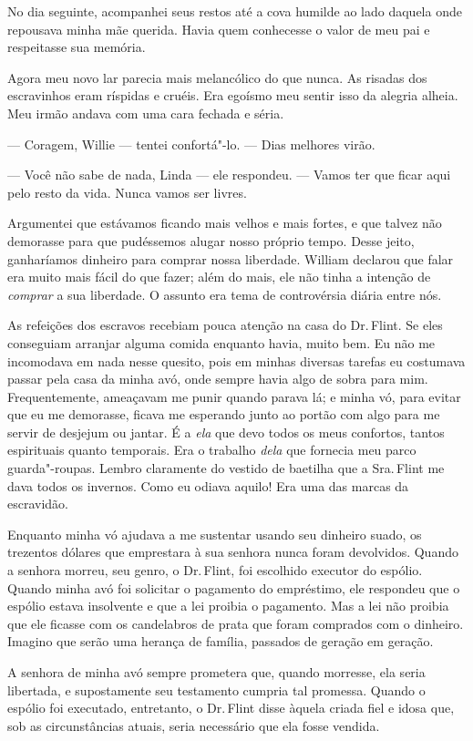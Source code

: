 No dia seguinte, acompanhei seus restos
até a cova humilde ao lado daquela onde repousava minha mãe querida.
Havia quem conhecesse o valor de meu pai e respeitasse sua memória.

Agora meu novo lar parecia mais
melancólico do que nunca. As risadas dos escravinhos eram ríspidas e
cruéis. Era egoísmo meu sentir isso da alegria alheia. Meu irmão andava
com uma cara fechada e séria.

--- Coragem, Willie --- tentei confortá"-lo. --- Dias melhores virão.

--- Você não sabe de nada, Linda ---
ele respondeu. --- Vamos ter que ficar aqui pelo resto da vida. Nunca
vamos ser livres.

Argumentei
que estávamos ficando mais velhos e mais fortes, e que talvez não
demorasse para que pudéssemos alugar nosso próprio tempo. Desse jeito,
ganharíamos dinheiro para comprar nossa liberdade. William declarou que
falar era muito mais fácil do que fazer; além do mais, ele não tinha a
intenção de \emph{comprar} a sua liberdade. O assunto era tema de
controvérsia diária entre nós.

As refeições dos escravos recebiam
pouca atenção na casa do Dr.\,Flint. Se eles conseguiam arranjar alguma
comida enquanto havia, muito bem. Eu não me incomodava em nada nesse
quesito, pois em minhas diversas tarefas eu costumava passar pela casa
da minha avó, onde sempre havia algo de sobra para mim. Frequentemente,
ameaçavam me punir quando parava lá; e minha vó, para evitar que eu me
demorasse, ficava me esperando junto ao portão com algo para me servir
de desjejum ou jantar. É a \emph{ela} que devo todos os meus confortos,
tantos espirituais quanto temporais. Era o trabalho \emph{dela} que
fornecia meu parco guarda"-roupas. Lembro claramente do vestido de
baetilha que a Sra.\,Flint me dava todos os invernos. Como eu odiava
aquilo! Era uma das marcas da escravidão.

Enquanto minha vó ajudava a me
sustentar usando seu dinheiro suado, os trezentos dólares que emprestara
à sua senhora nunca foram devolvidos. Quando a senhora morreu, seu
genro, o Dr.\,Flint, foi escolhido executor do espólio. Quando minha avó
foi solicitar o pagamento do empréstimo, ele respondeu que o espólio
estava insolvente e que a lei proibia o pagamento. Mas a lei não proibia
que ele ficasse com os candelabros de prata que foram comprados com o
dinheiro. Imagino que serão uma herança de família, passados de geração
em geração.

A senhora de minha avó sempre prometera
que, quando morresse, ela seria libertada, e supostamente seu testamento
cumpria tal promessa. Quando o espólio foi executado, entretanto, o Dr.\,Flint disse àquela criada fiel e idosa que, sob as circunstâncias
atuais, seria necessário que ela fosse vendida.

